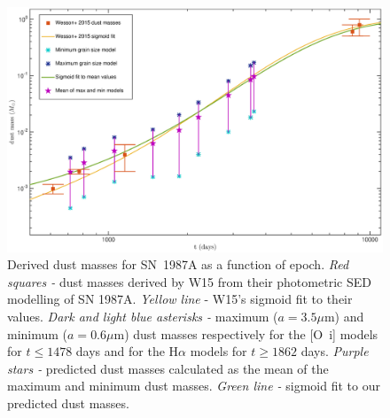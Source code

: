 \documentclass[useAMS,usenatbib,usegraphicx]{mnras}
\begin{document}

\begin{figure}
\begin{center}
\includegraphics[trim =100 30 105 15,clip=true,scale=0.48]{Mdust_evol4}
\caption{Derived dust masses for SN~1987A as a function of epoch. \textit{Red squares -} dust masses derived by W15 
from their photometric SED modelling of SN 1987A. \textit{Yellow line} - W15's sigmoid fit to 
their values. \textit{Dark and light blue asterisks -} maximum ($a=3.5\mu$m) and 
minimum ($a=0.6\mu$m) dust masses respectively for the [O~{\sc i}] models for $t \le 1478$ days and for the H$\alpha$ models for $t \ge 1862$ days. \textit{Purple 
stars -} predicted dust masses calculated as the mean of the maximum and minimum dust masses.
\textit{Green line -} sigmoid fit 
to our predicted dust masses.}
\label{Mdust}
\end{center}
\end{figure}
\end{document}
